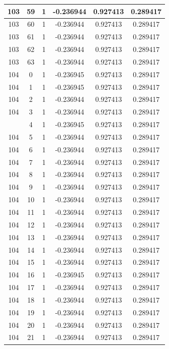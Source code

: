 \documentclass[12pt,a4paper]{article}
\numberwithin{equation}{section}
\numberwithin{figure}{section}
\numberwithin{table}{section}
\begin{document}
\begin{longtable}{|c|c|c|c|c|c|}
103 & 59 & 1 & -0.236944 & 0.927413 & 0.289417 \\ \hline
103 & 60 & 1 & -0.236944 & 0.927413 & 0.289417 \\ \hline
103 & 61 & 1 & -0.236944 & 0.927413 & 0.289417 \\ \hline
103 & 62 & 1 & -0.236944 & 0.927413 & 0.289417 \\ \hline
103 & 63 & 1 & -0.236944 & 0.927413 & 0.289417 \\ \hline
104 & 0 & 1 & -0.236945 & 0.927413 & 0.289417 \\ \hline
104 & 1 & 1 & -0.236945 & 0.927413 & 0.289417 \\ \hline
104 & 2 & 1 & -0.236944 & 0.927413 & 0.289417 \\ \hline
104 & 3 & 1 & -0.236944 & 0.927413 & 0.289417 \\ \hline
\pagebreak
104 & 4 & 1 & -0.236945 & 0.927413 & 0.289417 \\ \hline
104 & 5 & 1 & -0.236944 & 0.927413 & 0.289417 \\ \hline
104 & 6 & 1 & -0.236944 & 0.927413 & 0.289417 \\ \hline
104 & 7 & 1 & -0.236944 & 0.927413 & 0.289417 \\ \hline
104 & 8 & 1 & -0.236944 & 0.927413 & 0.289417 \\ \hline
104 & 9 & 1 & -0.236944 & 0.927413 & 0.289417 \\ \hline
104 & 10 & 1 & -0.236944 & 0.927413 & 0.289417 \\ \hline
104 & 11 & 1 & -0.236944 & 0.927413 & 0.289417 \\ \hline
104 & 12 & 1 & -0.236944 & 0.927413 & 0.289417 \\ \hline
104 & 13 & 1 & -0.236944 & 0.927413 & 0.289417 \\ \hline
104 & 14 & 1 & -0.236944 & 0.927413 & 0.289417 \\ \hline
104 & 15 & 1 & -0.236944 & 0.927413 & 0.289417 \\ \hline
104 & 16 & 1 & -0.236945 & 0.927413 & 0.289417 \\ \hline
104 & 17 & 1 & -0.236944 & 0.927413 & 0.289417 \\ \hline
104 & 18 & 1 & -0.236944 & 0.927413 & 0.289417 \\ \hline
104 & 19 & 1 & -0.236944 & 0.927413 & 0.289417 \\ \hline
104 & 20 & 1 & -0.236944 & 0.927413 & 0.289417 \\ \hline
104 & 21 & 1 & -0.236944 & 0.927413 & 0.289417 \\ \hline

\end{longtable}
\end{document}
